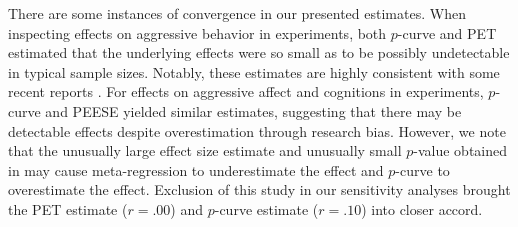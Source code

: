 \documentclass[man, mask]{apa6}
\begin{document}
There are some instances of convergence in our presented estimates. When inspecting effects on aggressive behavior in experiments, both $p$-curve and PET estimated that the underlying effects were so small as to be possibly undetectable in typical sample sizes. Notably, these estimates are highly consistent with some recent reports \citep{Engelhardt:etal:2015,Kneer:etal:inpress,Przybylski:etal:2014}. For effects on aggressive affect and cognitions in experiments, $p$-curve and PEESE yielded similar estimates, suggesting that there may be detectable effects despite overestimation through research bias. However, we note that the unusually large effect size estimate and unusually small $p$-value obtained in \citet{Ballard:Wiest:1996} may cause meta-regression to underestimate the effect and $p$-curve to overestimate the effect. Exclusion of this study in our sensitivity analyses brought the PET estimate ($r = .00$) and $p$-curve estimate ($r = .10$) into closer accord.



\end{document}
